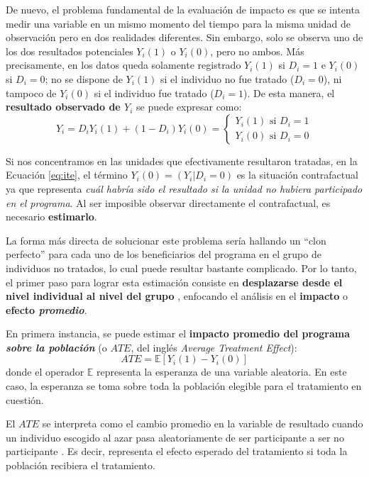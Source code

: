 \documentclass[../../main.tex]{subfiles}
\begin{document}
De nuevo, el problema fundamental de la evaluación de impacto es que se intenta medir una
variable en un mismo momento del tiempo para la misma unidad de observación pero en dos
realidades diferentes. Sin embargo, solo se observa uno de los dos resultados potenciales
\(Y_i(1)\) o \(Y_i(0)\), pero no ambos. Más precisamente, en los datos queda solamente
registrado \(Y_i(1)\) si \(D_i=1\) e \(Y_i(0)\) si \(D_i=0\); no se dispone de \(Y_i(1)\)
si el individuo no fue tratado (\(D_i=0\)), ni tampoco de \(Y_i(0)\) si el individuo fue
tratado (\(D_i=1\)). De esta manera, el \textbf{resultado observado de \(Y_i\)} se puede
expresar como:
\begin{equation}
    Y_i = D_i Y_i(1) + (1-D_i)Y_i(0) =
    \begin{cases}
        Y_i(1) \text{ si } D_i=1 \\
        Y_i(0) \text{ si } D_i=0
    \end{cases}
    \label{eq:observed-result}
\end{equation}

Si nos concentramos en las unidades que efectivamente resultaron tratadas, en la Ecuación
\ref{eq:ite}, el término \(Y_i(0) = (Y_i|D_i=0)\) es la situación contrafactual ya que
representa \textit{cuál habría sido el resultado si la unidad no hubiera participado en el
programa}. Al ser imposible observar directamente el contrafactual, es necesario
\textbf{estimarlo}.

La forma más directa de solucionar este problema sería hallando un ``clon perfecto'' para
cada uno de los beneficiarios del programa en el grupo de individuos no tratados, lo cual
puede resultar bastante complicado. Por lo tanto, el primer paso para lograr esta estimación
consiste en \textbf{desplazarse desde el nivel individual al nivel del grupo}
\cite{gertler-2016}, enfocando el análisis en el \textbf{impacto} o \textbf{efecto
\textit{promedio}}.

En primera instancia, se puede estimar el \textbf{impacto promedio del programa
\textit{sobre la población}} (o \(ATE\), del inglés \textit{Average Treatment Effect}):
\begin{equation}
    ATE = \mathbb{E}\left[Y_i(1)-Y_i(0)\right]
\end{equation}
donde el operador \(\mathbb{E}\) representa la esperanza de una variable aleatoria.
En este caso, la esperanza se toma sobre toda la población elegible para el tratamiento
en cuestión.

El \(ATE\) se interpreta como el cambio promedio en la variable de resultado cuando un
individuo escogido al azar pasa aleatoriamente de ser participante a ser no participante
\cite{bernal}. Es decir, representa el efecto esperado del tratamiento si toda la
población recibiera el tratamiento.
\end{document}
